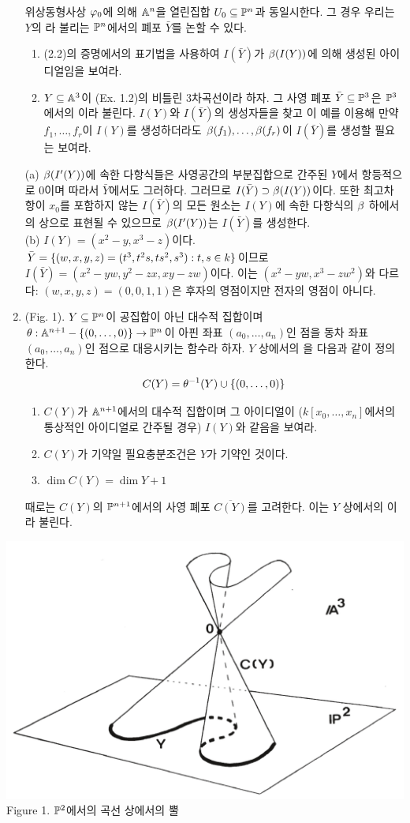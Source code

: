\begin{enumerate}[label=\tb{2.\arabic*.},itemindent=0mm,itemsep=4mm]
		위상동형사상 $\varphi_0$에 의해 $\mathbb{A}^n$을 열린집합 $U_0\subseteq\mathbb{P}^n$과 동일시한다.
		그 경우 우리는 $Y$의 라 불리는 $\mathbb{P}^n$에서의 폐포 $\bar Y$를 논할 수 있다.
		\begin{enumerate}[label=(\alph*)]
			\item (2.2)의 증명에서의 표기법을 사용하여 $I(\bar Y)$가 $\beta(I(Y))$에 의해 생성된 아이디얼임을 보여라.
			\item $Y\subseteq\mathbb{A}^3$이 (Ex. 1.2)의 비틀린 3차곡선이라 하자.
			그 사영 폐포 $\bar Y\subseteq\mathbb{P}^3$은 $\mathbb{P}^3$에서의 이라 불린다.
			$I(Y)$와 $I(\bar Y)$의 생성자들을 찾고 이 예를 이용해 만약 $f_1,\ldots,f_r$이 $I(Y)$를 생성하더라도
			$\beta(f_1),\ldots,\beta(f_r)$이 $I(\bar Y)$를 생성할 필요는  보여라.
		\end{enumerate}
		\sol (a) $\beta(I'(Y))$에 속한 다항식들은 사영공간의 부분집합으로 간주된 $Y$에서 항등적으로 0이며 따라서 $\bar Y$에서도 그러하다.
		그러므로 $I(\bar Y)\supset\beta(I(Y))$이다. 또한 최고차항이 $x_0$를 포함하지 않는 $I(\bar Y)$의 모든 원소는 $I(Y)$에 속한 다항식의
		$\beta$ 하에서의 상으로 표현될 수 있으므로 $\beta(I'(Y))$는 $I(\bar Y)$를 생성한다.\\
		(b) $I(Y)=(x^2-y,x^3-z)$이다. $\bar Y=\{(w,x,y,z)=(t^3,t^2s,ts^2,s^3):t,s\in k\}$이므로
		$I(\bar Y)=(x^2-yw,y^2-zx,xy-zw)$이다. 이는 $(x^2-yw,x^3-zw^2)$와 다르다:
		$(w,x,y,z)=(0,0,1,1)$은 후자의 영점이지만 전자의 영점이 아니다.
		\item {} (Fig. 1).
		$Y\subseteq\mathbb{P}^n$이 공집합이 아닌 대수적 집합이며 $\theta:\mathbb{A}^{n+1}-\{(0,\ldots,0)\}\rightarrow\mathbb{P}^n$이
		아핀 좌표 $(a_0,\ldots,a_n)$인 점을 동차 좌표 $(a_0,\ldots,a_n)$인 점으로 대응시키는 함수라 하자.
		$Y$ 상에서의 을 다음과 같이 정의한다.
		$$C(Y)=\theta^{-1}(Y)\cup\{(0,\ldots,0)\}$$
		\begin{enumerate}[label=(\alph*)]
			\item $C(Y)$가 $\mathbb{A}^{n+1}$에서의 대수적 집합이며 그 아이디얼이
			($k[x_0,\ldots,x_n]$에서의 통상적인 아이디얼로 간주될 경우) $I(Y)$와 같음을 보여라.
			\item $C(Y)$가 기약일 필요충분조건은 $Y$가 기약인 것이다.
			\item $\dim C(Y)=\dim Y+1$
		\end{enumerate}
		때로는 $C(Y)$의 $\mathbb{P}^{n+1}$에서의 사영 폐포 $\overline{C(Y)}$를 고려한다.
		이는 $Y$ 상에서의 이라 불린다.
	\end{enumerate}
	\begin{center}
	\includegraphics[width=0.5\columnwidth]{Figure1}\\
	Figure 1. $\mathbb{P}^2$에서의 곡선 상에서의 뿔
	\end{center}
